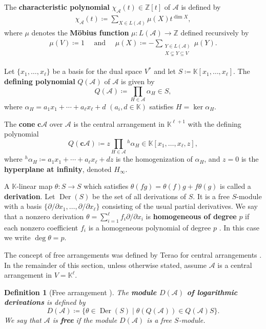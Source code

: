 \documentclass[11pt]{article}
\newtheorem{definition}[theo]{Definition}
\theoremstyle{definition}
\numberwithin{equation}{section}
\DeclareMathOperator{\Der}{Der}
\newcommand{\A}{\mathcal{A}}
\newcommand{\K}{\mathbb{K}}
\newcommand{\tbf}{\textbf}
\begin{document}
The \textbf{characteristic polynomial} $ \chi_{\mathcal{A}}(t) \in \mathbb{Z}[t] $ of $ \mathcal{A} $ is defined by
\begin{align*}
\chi_{\mathcal{A}}(t)  \coloneqq \sum_{X \in L(\mathcal{A})}\mu(X)t^{\dim X}, 
\end{align*}
where $ \mu $ denotes the \textbf{M\"{o}bius function} $ \mu \colon L(\mathcal{A}) \to \mathbb{Z} $ defined recursively by 
\begin{align*}
\mu\left( V \right)  \coloneqq 1 
\quad \text{ and } \quad 
\mu(X)  \coloneqq -\sum_{\substack{Y \in L(\mathcal{A}) \\ X \subsetneq Y  \subseteq V}}\mu(Y). 
\end{align*}

Let $ \{x_{1}, \dots, x_{\ell}\} $ be a basis for the dual space $V^{\ast} $ and let $ S  \coloneqq \mathbb{K}[x_{1}, \dots, x_{\ell}] $. 
The \textbf{defining polynomial} $Q(\A)$ of $\A$ is given by
$$Q(\A) \coloneqq \prod_{H \in \A} \alpha_H \in S,$$
where $ \alpha_H=a_1x_1+\cdots+a_\ell x_\ell+d$  $(a_i, d \in \mathbb{K})$ satisfies $H = \ker \alpha_H$. 


The \textbf{cone} $ \textbf{c}\A$ over $\A$ is the central arrangement in $\mathbb{K}^{\ell+1}$ with the defining polynomial
$$Q(\textbf{c}\A) \coloneqq z\prod_{H \in \A} {}^h\alpha_H \in \mathbb{K}[x_1,\ldots, x_\ell,z],$$
where $ {}^h\alpha_H \coloneqq a_1x_1+\cdots+a_\ell x_\ell+dz$ is the homogenization of $\alpha_H$, and $z=0$ is the \tbf{hyperplane at infinity}, denoted $H_{\infty}$. 

A $\K$-linear map $\theta:S\to S$ which satisfies $\theta(fg) = \theta(f)g + f\theta(g)$ is called a \tbf{derivation}.
Let $\Der(S)$ be the set of all derivations of $S$. 
It is a free $S$-module with a basis $\{\partial/\partial x_1,\ldots,\partial/\partial x_{\ell}\}$ consisting of the usual partial derivatives.
We say that a nonzero derivation $\theta  = \sum_{i=1}^\ell f_i \partial/\partial x_{i}$  is \tbf{homogeneous of degree} $p$ if each nonzero coefficient $f_i$ is a homogeneous polynomial of degree $p$ \cite[Definition 4.2]{OT92}.
In this case we write $\deg{\theta} = p$.

The concept of free arrangements was defined by Terao for central arrangements \cite{T80}. 
In the remainder of this section, unless otherwise stated, assume $\A$ is a central arrangement in  $V=\K^\ell$. 
\begin{definition}[Free arrangement {\cite[Definitions 4.5 and 4.15]{OT92}}]\label{def:free-arr}
The \textbf{module $D(\mathcal{A}) $ of logarithmic derivations}  is defined by 
	\begin{equation*}
	D(\A)  \coloneqq  \{ \theta \in \Der(S) \mid \theta(Q(\A)) \in Q(\A)S\}.
	\end{equation*}
	We say that $\A$ is \tbf{free} if the module $D(\A)$ is a free $S$-module. 
\end{definition}
\end{document}
